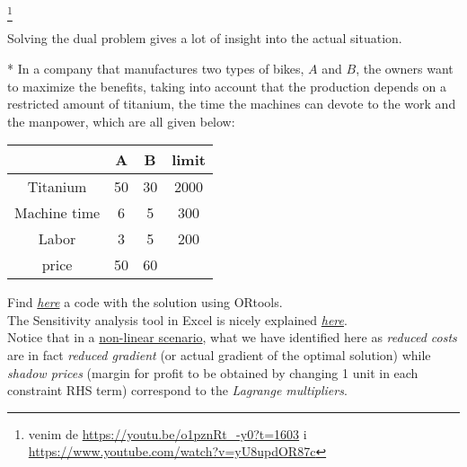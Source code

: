 \footnote{venim de \url{https://youtu.be/o1pznRt_-y0?t=1603} i \url{https://www.youtube.com/watch?v=yU8updOR87c}}


  Solving the dual problem gives a lot of insight into the actual situation.

  \begin{Exercise}*
  In a company that manufactures two types of bikes, $A$ and $B$, the owners want to maximize the benefits, taking into account that the production depends on a restricted amount of titanium, the time the machines can devote to the work and the manpower, which are all given below:
  \begin{center}
  \begin{tabular}{c|c|c|c}
   & A & B & limit\\
   \hline
   Titanium & 50 & 30 & 2000\\
    Machine time & 6 & 5 & 300\\
    Labor & 3 & 5 &200\\
   \hline
   price & 50 & 60 & \\
  \end{tabular}
  \end{center}



  \end{Exercise}



  Find \href{https://github.com/Biocomputing-Teaching/ORcourse/blob/main/code/linear_programming.ipynb}{\em here} a code with the solution using ORtools.
  \\[10pt]
  The Sensitivity analysis tool in Excel is nicely explained \href{https://www.youtube.com/watch?v=zKqU5NGE-t0&list=PLjiMsqjDUvBiArYMqCGZSDJNgEMPALdQu&index=1}{\em here}.
\\[10pt]
  Notice that in a \href{https://youtu.be/v2ZuKwAaXOI}{non-linear scenario}, what we have identified here as {\em reduced costs} are in fact {\em reduced gradient} (or actual gradient of the optimal solution) while {\em shadow prices} (margin for profit to be obtained by changing 1 unit in each constraint RHS term) correspond to the {\em Lagrange multipliers}.








